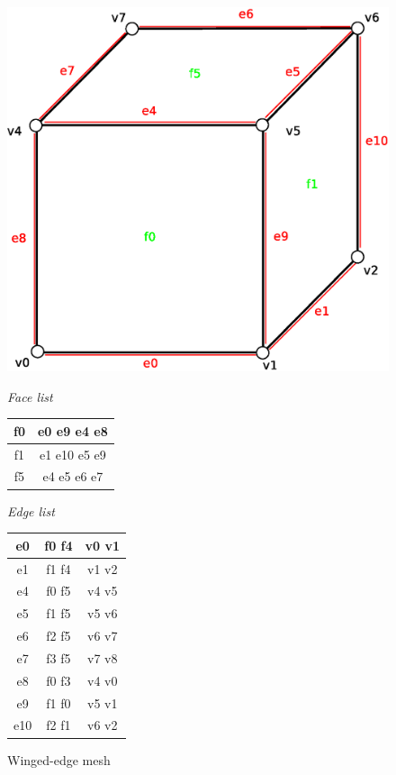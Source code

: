 \begin{figure}[!htbp]
\label{fig:winged_edge_mesh}

\begin{minipage}[!htbp]{0.65\linewidth}
\centering
\includegraphics[width=0.6\linewidth]{../img/we_rep_mesh.eps}
\label{fig:figure1}
\end{minipage}
\hspace{0.5cm}
\begin{minipage}[!htbp]{0.25\linewidth}
\centering

\emph{Face list}
\vspace{1mm}

\begin{tabular}{|c|c|}
\hline
\textsf{f0} & \textsf{e0 e9 e4 e8}\\
\hline
\textsf{f1} & \textsf{e1 e10 e5 e9}\\
\hline
\textsf{f5} & \textsf{e4 e5 e6 e7}\\
\hline
\end{tabular}

\vspace{10mm}
\emph{Edge list}
\vspace{1mm}

\begin{tabular}{|c|c|c|}
\hline
\textsf{e0} & \textsf{f0 f4} & \textsf{v0 v1}\\
\hline
\textsf{e1} & \textsf{f1 f4} & \textsf{v1 v2}\\
\hline
\textsf{e4} & \textsf{f0 f5} & \textsf{v4 v5}\\
\hline
\textsf{e5} & \textsf{f1 f5} & \textsf{v5 v6}\\
\hline
\textsf{e6} & \textsf{f2 f5} & \textsf{v6 v7}\\
\hline
\textsf{e7} & \textsf{f3 f5} & \textsf{v7 v8}\\
\hline
\textsf{e8} & \textsf{f0 f3} & \textsf{v4 v0}\\
\hline
\textsf{e9} & \textsf{f1 f0} & \textsf{v5 v1}\\
\hline
\textsf{e10} & \textsf{f2 f1} & \textsf{v6 v2}\\
\hline
\end{tabular}

\label{fig:we_mesh}
\end{minipage}

\caption{Winged-edge mesh}
\end{figure}


